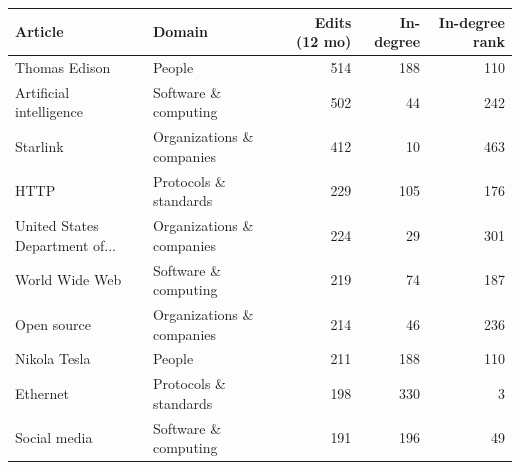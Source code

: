 
\begin{tabular}{llrrr}
\toprule
Article & Domain & Edits (12 mo) & In-degree & In-degree rank\\
\midrule
Thomas Edison & People & 514 & 188 & 110\\
Artificial intelligence & Software \& computing & 502 & 44 & 242\\
Starlink & Organizations \& companies & 412 & 10 & 463\\
HTTP & Protocols \& standards & 229 & 105 & 176\\
United States Department of... & Organizations \& companies & 224 & 29 & 301\\
World Wide Web & Software \& computing & 219 & 74 & 187\\
Open source & Organizations \& companies & 214 & 46 & 236\\
Nikola Tesla & People & 211 & 188 & 110\\
Ethernet & Protocols \& standards & 198 & 330 & 3\\
Social media & Software \& computing & 191 & 196 & 49\\
\bottomrule
\end{tabular}
